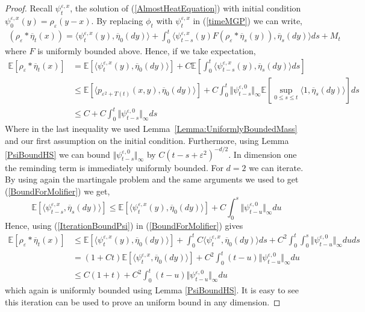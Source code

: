 \documentclass[a4paper,12pt]{article}
\newcommand{\EE}{\mathbb{E}}
\newcommand{\1}{{\bf {1}}}
\def\epsilon{\varepsilon}
\begin{document}
\begin{proof}
Recall $\psi_t^{\epsilon,x}$, the solution of (\ref{AlmostHeatEquation}) with initial condition $\psi_0^{\epsilon,x}(y)=\rho_\epsilon(y-x)$. By replacing $\phi_t$ with $\psi_t^{\epsilon,x}$ in (\ref{timeMGP}) we can write,
\begin{align}
(\rho_\epsilon*\overline{\eta}_t(x)) = \langle \psi_t^{\epsilon,x}(y), \overline{\eta}_0(dy) \rangle  + \int_0^t \langle \psi_{t-s}^{\epsilon,x}(y) F(\rho_\epsilon*\overline{\eta}_s(y)), \overline{\eta}_s(dy) \rangle ds + M_t \label{MartingaleProblemMolifier}
\end{align}
where $F$ is uniformly bounded above. Hence, if we take expectation,
\begin{align}
\EE[\rho_\epsilon * \overline{\eta}_t(x)]&= \EE[\langle \psi_t^{\epsilon,x}(y), \overline{\eta}_0(dy) \rangle] + C \EE[\int_0^t \langle \psi_{t-s}^{\epsilon,x}(y), \overline{\eta}_s(dy) \rangle ds] \nonumber \\ & \leq  \EE[\langle p_{\epsilon^2+T(t)}(x,y),\overline{\eta}_0(dy)\rangle] + C \int_0^t \Vert \psi_{t-s}^{\epsilon,0} \Vert_\infty \EE[\sup_{0 \leq s \leq t} \langle 1, \overline{\eta}_s(dy) \rangle] ds \\ & \leq C + C \int_0^t \Vert \psi_{t-s}^{\epsilon,0} \Vert_\infty ds \label{BoundForMolifier}
\end{align}
Where in the last inequality we used Lemma~\ref{Lemma:UniformlyBoundedMass} and our first assumption on the initial condition. Furthermore, using Lemma \ref{PsiBoundHS} we can bound $\Vert \psi_{t-s}^{\epsilon,0} \Vert_\infty$ by $C (t-s+\epsilon^2)^{-d/2}$. In dimension one the reminding term is immediately uniformly bounded. For $d=2$ we can iterate. By using again the martingale problem and the same arguments we used to get (\ref{BoundForMolifier}) we get,
\begin{equation} \label{IterationBoundPsi}
\EE[\langle \psi_{t-s}^{\epsilon,x}, \overline{\eta}_s(dy)\rangle] \leq \EE[\langle \psi_{t}^{\epsilon,x}(y), \overline{\eta}_0(dy) \rangle]  + C \int_0^s \Vert \psi_{t-u}^{\epsilon,0} \Vert_\infty du
\end{equation}
Hence, using (\ref{IterationBoundPsi}) in (\ref{BoundForMolifier}) gives
\begin{align*}
\EE[ \rho_\epsilon * \overline{\eta}_t(x)  ] &\leq \EE[\langle \psi_t^{\epsilon,x}(y), \overline{\eta}_0(dy) \rangle] + \int_0^t C\langle \psi_{t}^{\epsilon,x}, \overline{\eta}_0(dy)\rangle ds + C^2 \int_0^t \int_0^s  \Vert \psi_{t-u}^{\epsilon,0} \Vert_\infty du ds \\ &= (1+Ct) \EE[ \langle \psi_t^{\epsilon,x}, \overline{\eta}_0(dy) \rangle] + C^2 \int_0^t (t-u) \Vert \psi_{t-u}^{\epsilon,0} \Vert_\infty du \\ &\leq C(1+t) + C^2 \int_0^t (t-u) \Vert \psi_{t-u}^{\epsilon,0} \Vert_\infty du
\end{align*}
which again is uniformly bounded using Lemma \ref{PsiBoundHS}. It is easy to see this iteration can be used to prove an uniform bound in any dimension. 

\end{proof}
\end{document}
